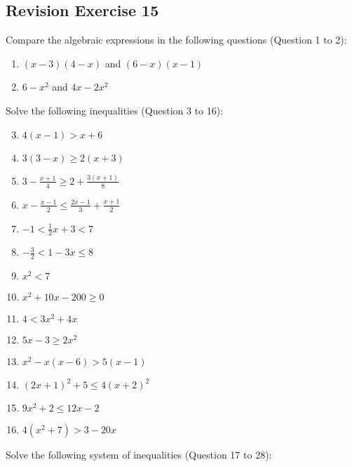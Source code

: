 \documentclass{report}
\begin{document}
\begin{multicols}{2}
    \section{Revision Exercise 15}

    Compare the algebraic expressions in the following questions (Question 1 to 2):
    \begin{enumerate}
        \item $(x-3)(4-x)$ and $(6-x)(x-1)$
        \item $6 - x^2$ and $4x - 2x^2$
    \end{enumerate}

    \noindent Solve the following inequalities (Question 3 to 16):
    \begin{enumerate}
        \setcounter{enumi}{2}
        \item $4(x-1) > x+6$
        \item $3(3-x) \geq 2(x+3)$
        \item $3-\frac{x+1}{4} \geq 2+\frac{3(x+1)}{8}$
        \item $x-\frac{x-1}{2} \leq \frac{2x-1}{3} + \frac{x+1}{2}$
        \item $-1 < \frac{1}{2}x + 3 < 7$
        \item $-\frac{3}{2} < 1 - 3x \leq 8$
        \item $x^2 < 7$
        \item $x^2 + 10x - 200 \geq 0$
        \item $4 < 3x^2 + 4x$
        \item $5x - 3 \geq 2x^2$
        \item $x^2 - x(x-6) > 5(x-1)$
        \item ${(2x+1)}^2 + 5 \leq 4{(x+2)}^2$
        \item $9x^2 + 2 \leq 12x - 2$
        \item $4(x^2 + 7) > 3 - 20x$
    \end{enumerate}

    \noindent Solve the following system of inequalities (Question 17 to 28):


\end{multicols}
\end{document}
